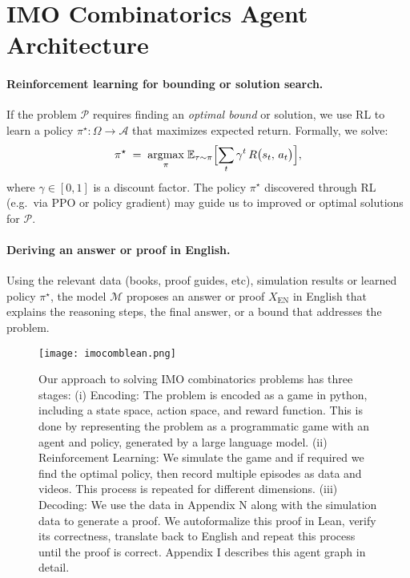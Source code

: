 \section{IMO Combinatorics Agent Architecture}
\label{appendix:I}

\paragraph{Reinforcement learning for bounding or solution search.}
If the problem \(\mathcal{P}\) requires finding an \emph{optimal bound} or solution, we use RL to learn a policy \(\pi^\star\colon \Omega \to \mathcal{A}\) that maximizes expected return. Formally, we solve:
\[
\pi^\star \;=\; \underset{\pi}{\mathrm{argmax}} \;
\mathbb{E}_{\tau \sim \pi}\Bigl[\sum_{t} \gamma^t\, R\bigl(s_t,\, a_t\bigr)\Bigr],
\]
where \(\gamma \in [0,1]\) is a discount factor. The policy \(\pi^\star\) discovered through RL (e.g.\ via PPO or policy gradient) may guide us to improved or optimal solutions for \(\mathcal{P}\). 

\paragraph{Deriving an answer or proof in English.}
Using the relevant data (books, proof guides, etc), simulation results or learned policy \(\pi^\star\), the model \(\mathcal{M}\) proposes an answer or proof $X_{\mathrm{EN}}$ in English
that explains the reasoning steps, the final answer, or a bound that addresses the problem.


\begin{figure*}[htb]
  \centering
   \texttt{[image: imocomblean.png]}
   \caption{Our approach to solving IMO combinatorics problems has three stages: (i) Encoding: The problem is encoded as a game in python, including a state space, action space, and reward function. This is done by representing the problem as a programmatic game with an agent and policy, generated by a large language model. (ii) Reinforcement Learning: We simulate the game and if required we find the optimal policy, then record multiple episodes as data and videos. This process is repeated for different dimensions. (iii) Decoding: We use the data in Appendix N along with the simulation data to generate a proof. We autoformalize this proof in Lean, verify its correctness, translate back to English and repeat this process until the proof is correct. Appendix I describes this agent graph in detail.}

   \label{fig:combinatorics_pipeline}
   \vspace{-5pt}
\end{figure*}

